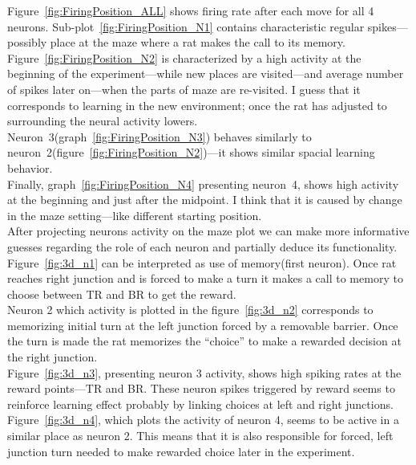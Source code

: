 \documentclass[12pt,a4paper,twocolumn]{article}
\begin{document}

Figure~\ref{fig:FiringPosition_ALL} shows firing rate after each move for all 4 neurons. Sub-plot~\ref{fig:FiringPosition_N1} contains characteristic regular spikes---possibly place at the maze where a rat makes the call to its memory.\\
Figure~\ref{fig:FiringPosition_N2} is characterized by a high activity at the beginning of the experiment---while new places are visited---and average number of spikes later on---when the parts of maze are re-visited. I guess that it corresponds to learning in the new environment; once the rat has adjusted to surrounding the neural activity lowers.\\
Neuron~3(graph~\ref{fig:FiringPosition_N3}) behaves similarly to neuron~2(figure~\ref{fig:FiringPosition_N2})---it shows similar spacial learning behavior.\\
Finally, graph~\ref{fig:FiringPosition_N4} presenting neuron~4, shows high activity at the beginning and just after the midpoint. I think that it is caused by change in the maze setting---like different starting position.\\

After projecting neurons activity on the maze plot we can make more informative guesses regarding the role of each neuron and partially deduce its functionality.\\

Figure~\ref{fig:3d_n1} can be interpreted as use of memory(first neuron). Once rat reaches right junction and is forced to make a turn it makes a call to memory to choose between TR and BR to get the reward.\\

Neuron 2 which activity is plotted in the figure~\ref{fig:3d_n2} corresponds to memorizing initial turn at the left junction forced by a removable barrier. Once the turn is made the rat memorizes the ``choice'' to make a rewarded decision at the right junction.\\

Figure~\ref{fig:3d_n3}, presenting neuron 3 activity, shows high spiking rates at the reward points---TR and BR. These neuron spikes triggered by reward seems to reinforce learning effect probably by linking choices at left and right junctions.\\

Figure~\ref{fig:3d_n4}, which plots the activity of neuron 4, seems to be active in a similar place as neuron 2. This means that it is also responsible for forced, left junction turn needed to make rewarded choice later in the experiment.\\
\end{document}
